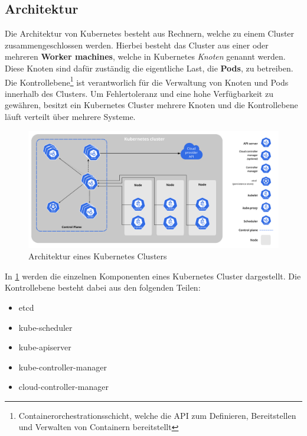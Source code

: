 \subsection{Architektur}
\label{subsec:kubernetes:architecture}
Die Architektur von Kubernetes besteht aus Rechnern, welche zu einem Cluster zusammengeschlossen werden.
Hierbei besteht das Cluster aus einer oder mehreren \textbf{Worker machines}, welche in Kubernetes \emph{Knoten}
genannt werden. Diese Knoten sind dafür zuständig die eigentliche Last, die \textbf{Pods}, zu betreiben.
Die Kontrollebene\footnote{Containerorchestrationsschicht, welche die API zum Definieren, Bereitstellen und Verwalten von Containern bereitstellt}
ist verantworlich für die Verwaltung von Knoten und Pods innerhalb des Clusters. 
Um Fehlertoleranz und eine hohe Verfügbarkeit zu gewähren, besitzt ein Kubernetes Cluster mehrere Knoten und
die Kontrollebene läuft verteilt über mehrere Systeme.

\begin{figure}
  \centering
  \includegraphics[width=1.2\textwidth]{gfx/chapters/2_grundlagen/components-of-kubernetes.pdf}
  \caption{Architektur eines Kubernetes Clusters}
  \label{fig:kubernetes_architecture}
\end{figure}

In \ref{fig:kubernetes_architecture} werden die einzelnen Komponenten eines Kubernetes Cluster dargestellt.
Die Kontrollebene besteht dabei aus den folgenden Teilen:
\begin{itemize}
  \item etcd
  \item kube-scheduler
  \item kube-apiserver
  \item kube-controller-manager
  \item cloud-controller-manager
\end{itemize}

